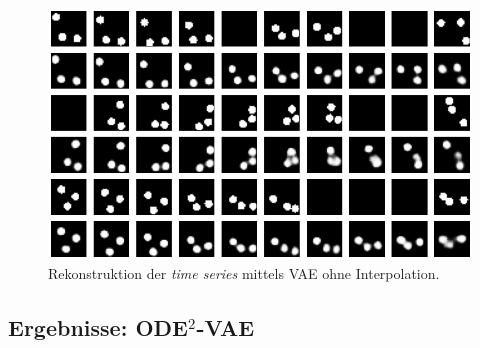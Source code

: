 \documentclass[12pt]{article}
\begin{document}
	\begin{figure}[!htbp]
		\centering
		\includegraphics[scale=0.8]{whole_sequence_bouncingBalls}
		\caption{Rekonstruktion der \emph{time series} mittels VAE ohne Interpolation.}
	\end{figure}
	\newpage
	\subsection[ODE$^2$-VAE]{Ergebnisse: ODE$^2$-VAE}

\end{document}
